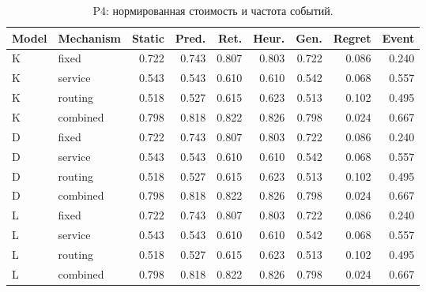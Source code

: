 \begin{table}[htbp]\caption{P4: нормированная стоимость и частота событий.}\centering\small\setlength{\tabcolsep}{3pt}

\begin{tabular}{llrrrrrrr}\toprule

Model & Mechanism & Static & Pred. & Ret. & Heur. & Gen. & Regret & Event\\\midrule

K & fixed & 0.722 & 0.743 & 0.807 & 0.803 & 0.722 & 0.086 & 0.240\\

K & service & 0.543 & 0.543 & 0.610 & 0.610 & 0.542 & 0.068 & 0.557\\

K & routing & 0.518 & 0.527 & 0.615 & 0.623 & 0.513 & 0.102 & 0.495\\

K & combined & 0.798 & 0.818 & 0.822 & 0.826 & 0.798 & 0.024 & 0.667\\

D & fixed & 0.722 & 0.743 & 0.807 & 0.803 & 0.722 & 0.086 & 0.240\\

D & service & 0.543 & 0.543 & 0.610 & 0.610 & 0.542 & 0.068 & 0.557\\

D & routing & 0.518 & 0.527 & 0.615 & 0.623 & 0.513 & 0.102 & 0.495\\

D & combined & 0.798 & 0.818 & 0.822 & 0.826 & 0.798 & 0.024 & 0.667\\

L & fixed & 0.722 & 0.743 & 0.807 & 0.803 & 0.722 & 0.086 & 0.240\\

L & service & 0.543 & 0.543 & 0.610 & 0.610 & 0.542 & 0.068 & 0.557\\

L & routing & 0.518 & 0.527 & 0.615 & 0.623 & 0.513 & 0.102 & 0.495\\

L & combined & 0.798 & 0.818 & 0.822 & 0.826 & 0.798 & 0.024 & 0.667\\

\bottomrule\end{tabular}\end{table}

